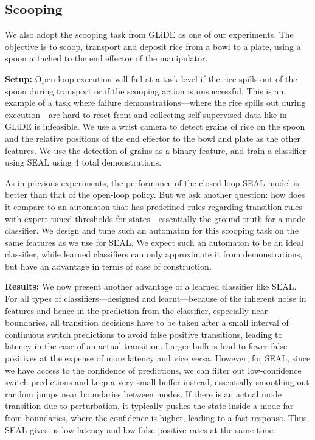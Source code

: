 \documentclass[journal]{IEEEtran}
\begin{document}
\subsection{Scooping}\label{sec:scooping}
We also adopt the scooping task from GLiDE as one of our experiments. The objective is to scoop, transport and deposit rice from a bowl to a plate, using a spoon attached to the end effector of the manipulator.


 \textbf{Setup:} Open-loop execution will fail at a task level if the rice spills out of the spoon during transport or if the scooping action is unsuccessful. This is an example of a task where failure demonstrations—where the rice spills out during execution—are hard to reset from and collecting self-supervised data like in GLiDE is infeasible. We use a wrist camera to detect grains of rice on the spoon and the relative positions of the end effector to the bowl and plate as the other features. We use the detection of grains as a binary feature, and train a classifier using SEAL using 4 total demonstrations.
    
    As in previous experiments, the performance of the closed-loop SEAL model is better than that of the open-loop policy. But we ask another question: how does it compare to an automaton that has predefined rules regarding transition rules with expert-tuned thresholds for states—essentially the ground truth for a mode classifier. We design and tune such an automaton for this scooping task on the same features as we use for SEAL. We expect such an automaton to be an ideal classifier, while learned classifiers can only approximate it from demonstrations, but have an advantage in terms of ease of construction.
    
\textbf{Results:} We now present another advantage of a learned classifier like SEAL. For all types of classifiers—designed and learnt—because of the inherent noise in features and hence in the prediction from the classifier, especially near boundaries, all transition decisions have to be taken after a small interval of continuous switch predictions to avoid false positive transitions, leading to latency in the case of an actual transition. Larger buffers lead to fewer false positives at the expense of more latency and vice versa. However, for SEAL, since we have access to the confidence of predictions, we can filter out low-confidence switch predictions and keep a very small buffer instead, essentially smoothing out random jumps near boundaries between modes. If there is an actual mode transition due to perturbation, it typically pushes the state inside a mode far from boundaries, where the confidence is higher, leading to a fast response. Thus, SEAL gives us low latency and low false positive rates at the same time.
    
\end{document}
